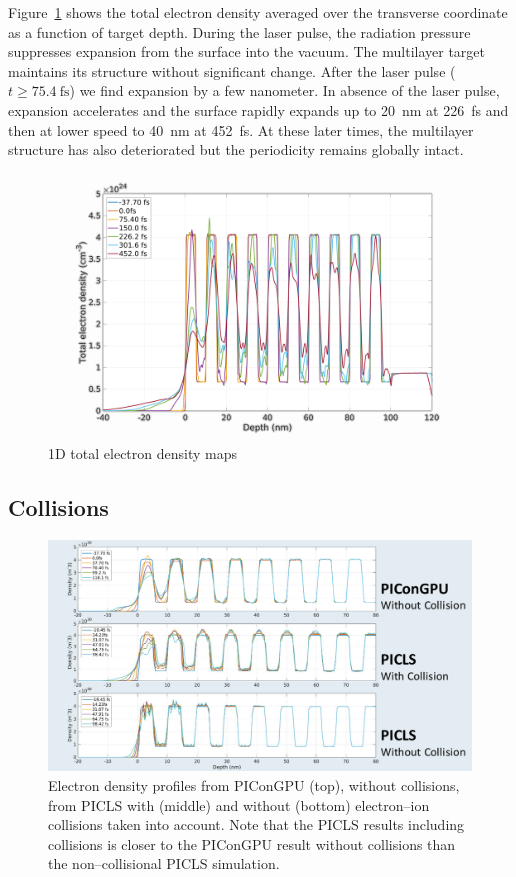 \documentclass[preprint, 12pt]{elsarticle}
\begin{document}
%
Figure~\ref{fig:edens_1D} shows the total electron density averaged over the
transverse coordinate as a function of target depth.
During the laser pulse, the radiation pressure
suppresses expansion from the surface into the vacuum. The multilayer
target maintains its structure without significant change. After the laser pulse
($t\geq \SI{75.4}{\fs}$) we find expansion by a few nanometer. In absence of the
laser pulse, expansion accelerates and the surface rapidly expands up to \SI{20}{\nm} at
\SI{226}{\fs} and then at lower speed to \SI{40}{\nm} at \SI{452}{\fs}.
At these later times, the multilayer structure has also deteriorated but the
periodicity remains globally intact.
%
\begin{figure}[ht]
  \centering%
  \includegraphics[width=0.8\linewidth]{Paper_plot_1D.png}
  \caption{1D total electron density maps}
  \label{fig:edens_1D}
\end{figure}
%
\subsection{Collisions\label{sec:collisions}}
\begin{figure}[ht]
  \begin{center}
    \includegraphics[width=.8\textwidth,angle=0,clip]{figures/ne_profiles_picongpu_vs_picls_collisions}
  \end{center}
  \caption{Electron density profiles from PIConGPU (top), without collisions,
    from PICLS  with (middle) and without (bottom) electron--ion collisions
    taken into account. Note that the PICLS results including collisions is
    closer to the PIConGPU result without collisions than the non--collisional
    PICLS simulation.
  }
  \label{fig:ne_collisions_pic}
\end{figure}
%
\end{document}
